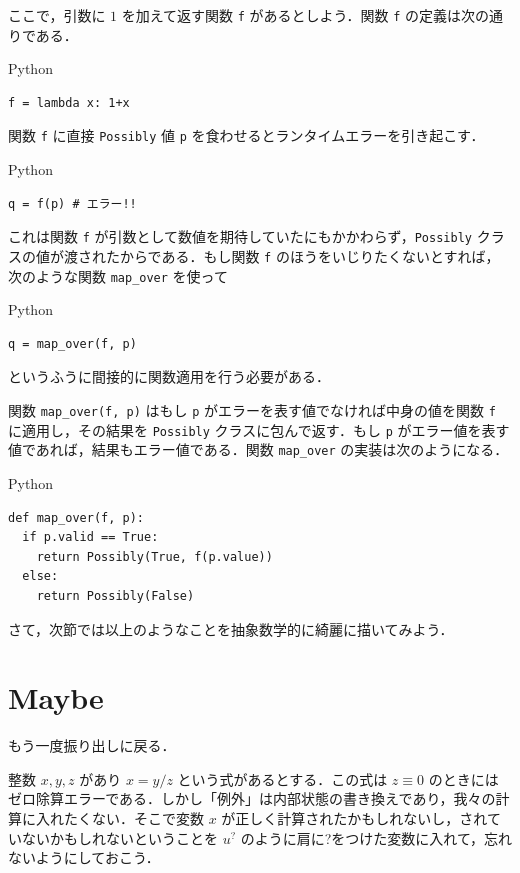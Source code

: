 \documentclass[a4paper,twocolumn]{jsbook}
\newcommand{\programminglanguage}[1]{\textsf{#1}}
\newcommand{\python}{\programminglanguage{Python}}
\newcommand{\code}[1]{\texttt{#1}}
\newenvironment{pythoncode}{\begin{itembox}[r]{\python}}{\end{itembox}}
\newcommand{\mMaybe}[1]{{#1}^?}
\begin{document}
ここで，引数に $1$ を加えて返す関数 \code{f} があるとしよう．関数 \code{f} の定義は次の通りである．
\begin{pythoncode}
\begin{verbatim}
f = lambda x: 1+x
\end{verbatim}
\end{pythoncode}

関数 \code{f} に直接 \code{Possibly} 値 \code{p} を食わせるとランタイムエラーを引き起こす．
\begin{pythoncode}
\begin{verbatim}
q = f(p) # エラー!!
\end{verbatim}
\end{pythoncode}
これは関数 \code{f} が引数として数値を期待していたにもかかわらず，\code{Possibly} クラスの値が渡されたからである．もし関数 \code{f} のほうをいじりたくないとすれば，次のような関数 \code{map\_over} を使って
\begin{pythoncode}
\begin{verbatim}
q = map_over(f, p)
\end{verbatim}
\end{pythoncode}
というふうに間接的に関数適用を行う必要がある．

関数 \code{map\_over(f, p)} はもし \code{p} がエラーを表す値でなければ中身の値を関数 \code{f} に適用し，その結果を \code{Possibly} クラスに包んで返す．もし \code{p} がエラー値を表す値であれば，結果もエラー値である．関数 \code{map\_over} の実装は次のようになる．
\begin{pythoncode}
\begin{verbatim}
def map_over(f, p):
  if p.valid == True:
    return Possibly(True, f(p.value))
  else:
    return Possibly(False)
\end{verbatim}
\end{pythoncode}

さて，次節では以上のようなことを抽象数学的に綺麗に描いてみよう．

\section{Maybe}

もう一度振り出しに戻る．

整数 $x,y,z$ があり $x=y/z$ という式があるとする．この式は $z\equiv0$ のときにはゼロ除算エラーである．しかし「例外」は内部状態の書き換えであり，我々の計算に入れたくない．そこで変数 $x$ が正しく計算されたかもしれないし，されていないかもしれないということを $\mMaybe{u}$ のように肩に?をつけた変数に入れて，忘れないようにしておこう．
\end{document}
